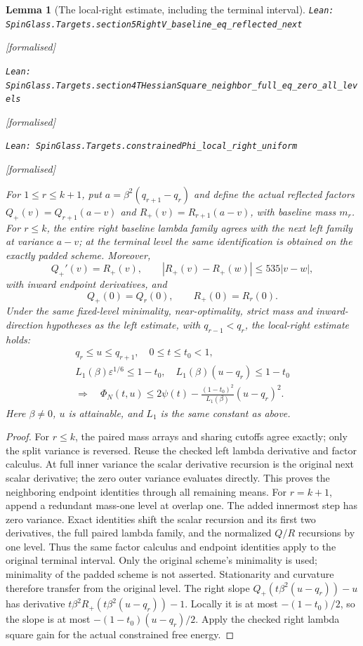 \documentclass[11pt]{article}
\providecommand{\lean}[1]{\leavevmode\par\nopagebreak
  {\noindent\normalfont\footnotesize\raggedright\texttt{Lean: #1}\par}\nopagebreak}
\providecommand{\leanok}{\par\nopagebreak
  {\noindent\normalfont\footnotesize\textcolor{green!50!black}{[formalised]}\par}\nopagebreak}
\newtheorem{lemma}[theorem]{Lemma}
\begin{document}
\begin{lemma}[The local-right estimate, including the terminal interval]
\lean{SpinGlass.Targets.section5RightV\_baseline\_eq\_reflected\_next}\leanok
\lean{SpinGlass.Targets.section4THessianSquare\_neighbor\_full\_eq\_zero\_all\_levels}\leanok
\lean{SpinGlass.Targets.constrainedPhi\_local\_right\_uniform}\leanok
For $1\le r\le k+1$, put $a=\beta^2(q_{r+1}-q_r)$ and define the actual
reflected factors $Q_+(v)=Q_{r+1}(a-v)$ and $R_+(v)=R_{r+1}(a-v)$,
with baseline mass $m_r$. For $r\le k$, the entire right baseline lambda family
agrees with the next left family at variance $a-v$; at the terminal level the
same identification is obtained on the exactly padded scheme. Moreover,
\[
 Q_+'(v)=R_+(v),\qquad
 |R_+(v)-R_+(w)|\le535|v-w|,
\]
with inward endpoint derivatives, and
\[
 Q_+(0)=Q_r(0),\qquad R_+(0)=R_r(0).
\]
Under the same fixed-level minimality, near-optimality, strict mass and
inward-direction hypotheses as the left estimate, with $q_{r-1}<q_r$,
the local-right estimate holds:
\[
 \begin{gathered}
 q_r\le u\le q_{r+1},\quad 0\le t\le t_0<1,\\
 L_1(\beta)\varepsilon^{1/6}\le1-t_0,\quad
 L_1(\beta)(u-q_r)\le1-t_0\\
 \Longrightarrow\quad
 \Phi_N(t,u)\le2\psi(t)-\frac{(1-t_0)^2}{L_1(\beta)}(u-q_r)^2.
 \end{gathered}
\]
Here $\beta\ne0$, $u$ is attainable, and $L_1$ is the same constant as above.
\end{lemma}
\begin{proof}
For $r\le k$, the paired mass arrays and sharing cutoffs agree exactly; only the split
variance is reversed. Reuse the checked left lambda derivative and factor
calculus. At full inner variance the scalar derivative recursion is the
original next scalar derivative; the zero outer variance evaluates directly.
This proves the neighboring endpoint identities through all remaining means.
For $r=k+1$, append a redundant mass-one level at overlap one. The added
innermost step has zero variance. Exact identities shift the scalar recursion
and its first two derivatives, the full paired lambda family, and the normalized
$Q/R$ recursions by one level. Thus the same factor calculus and endpoint
identities apply to the original terminal interval. Only the original scheme's
minimality is used; minimality of the padded scheme is not asserted.
Stationarity and curvature therefore transfer from the original level.
The right slope $Q_+(t\beta^2(u-q_r))-u$ has derivative
$t\beta^2R_+(t\beta^2(u-q_r))-1$. Locally it is at most
$-(1-t_0)/2$, so the slope is at most $-(1-t_0)(u-q_r)/2$.
Apply the checked right lambda square gain for the actual constrained free energy.
\end{proof}
\end{document}
